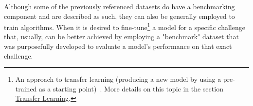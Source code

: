 \documentclass[class=report, crop=false, a4paper, 12pt]{standalone}
\begin{document}
\vspace{\baselineskip}
\par Although some of the previously referenced datasets do have a benchmarking component and are described as such, they can also be generally employed to train algorithms. When it is desired to fine-tune\footnote{An approach to transfer learning (producing a new model by using a pre-trained as a starting point)~\autocite{zhuangComprehensiveSurveyTransfer2020}. More details on this topic in the section \hyperref[transf learning]{Transfer Learning}.} a model for a specific challenge that, usually,  can be better achieved by employing a "benchmark" dataset that was purposefully developed to evaluate a model's performance on that exact challenge. 

\vspace{\baselineskip}
\centerline{
    \noindent
}

\vspace{\baselineskip}
\end{document}
